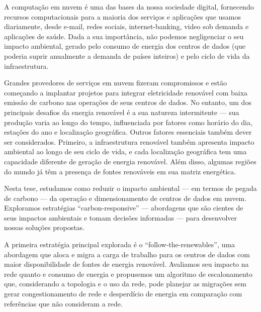 A computação em nuvem é uma das bases da nossa sociedade digital, fornecendo recursos computacionais para a maioria dos serviços e aplicações que usamos diariamente, desde e-mail, redes sociais, internet-banking, video sob demanda e aplicações de saúde. Dada a sua importância, não podemos negligenciar o seu impacto ambiental, gerado pelo consumo de energia dos centros de dados (que poderia suprir anualmente a demanda de países inteiros) e pelo ciclo de vida da infraestrutura.

Grandes provedores de serviços em nuvem fizeram compromissos e estão começando a implantar projetos para integrar eletricidade renovável com baixa emissão de carbono nas operações de seus centros de dados. No entanto, um dos principais desafios da energia renovável é a sua natureza intermitente --- sua produção varia ao longo do tempo, influenciada por fatores como horário do dia, estações do ano e localização geográfica. Outros fatores essenciais também dever ser considerados. Primeiro, a infraestrutura renovável também apresenta impacto ambiental ao longo de seu ciclo de vida, e cada localização geográfica tem uma capacidade diferente de geração de energia renovável. Além disso, algumas regiões do mundo já têm a presença de fontes renováveis em sua matriz energética.


Nesta tese, estudamos como reduzir o impacto ambiental --- em termos de pegada de carbono --- da operação e dimensionamento de centros de dados em nuvem. Exploramos estratégias ``carbon-responsive'' --- abordagens que são cientes de seus impactos ambientais e tomam decisões informadas --- para desenvolver nossas soluções propostas.

A primeira estratégia principal explorada é o ``follow-the-renewables'', uma abordagem que aloca e migra a carga de trabalho para os centros de dados com maior disponibilidade de fontes de energia renovável. Avaliamos seu impacto na rede quanto e consumo de energia e propusemos um algoritmo de escalonamento que, considerando a topologia  e o uso da rede, pode planejar as migrações sem gerar congestionamento de rede e desperdício de energia em comparação com referências que não consideram a rede.

